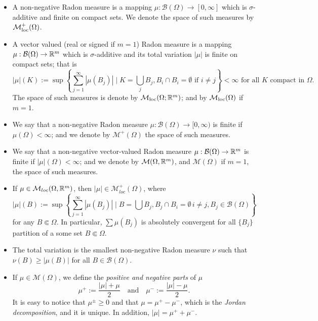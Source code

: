 \begin{definition} \hfill
\begin{itemize}
\item A non-negative Radon measure is a mapping $\mu : \mathcal{B}(\Omega) \to
[0,\infty]$ which is $\sigma$-additive and finite on compact sets. We denote the space of such measures by $\mathcal{M}_{\rm loc}^{+}(\Omega)$.
\item A vector valued (real or signed if $m = 1$) Radon measure is a mapping $\mu :
\mathcal{B}(\Omega) \to \mathbb{R}^m$ which is $\sigma$-additive and its total variation
$|\mu|$ is finite on compact sets; that is
\[
|\mu|(K) := \sup \left\{
\sum_{j=1}^\infty |\mu(B_j)| \mid K = \bigcup_{j} B_j, B_i \cap B_i = \emptyset
\text{ if } i\neq j
\right\} < \infty \text{ for all $K$ compact in $\Omega$}.
\]
The space of such measures is denote by $\mathcal{M}_{\rm loc}(\Omega; \mathbb{R}^{m})$; and by $\mathcal{M}_{\rm loc}(\Omega)$ if $m = 1$.
\item We say that a non-negative Radon measure $\mu : \mathcal{B}(\Omega) \to
[0,\infty)$ is finite if $\mu(\Omega) < \infty$; and we denote by $\mathcal{M}^+(\Omega)$ the space of such measures.
\item We say that a non-negative vector-valued Radon measure $\mu : \mathcal{B}(\Omega) \to
\mathbb{R}^m$ is finite if $|\mu|(\Omega) < \infty$; and we denote by $\mathcal{M}(\Omega,\mathbb{R}^m)$, and $\mathcal{M}(\Omega)$ if $m = 1$, the space of such measures.
\end{itemize}
\end{definition}

\begin{remarks} \hfill
\begin{itemize}
\item If $\mu \in \mathcal{M}_{loc}(\Omega,\mathbb{R}^m)$, then $|\mu| \in
\mathcal{M}^+_{loc}(\Omega)$, where
\[
|\mu|(B) := \sup \left \{\sum_{j=1} ^\infty |\mu(B_j)| \mid 
B= \bigcup B_j, B_j \cap B_i = \emptyset \, i\neq j, B_j \in \mathcal{B}(\Omega)
\right \}
\]
for any $B \Subset \Omega$.
In particular, $\sum \mu(B_j)$ is absolutely convergent for all $\{B_j\}$
partition of a some set $B \Subset \Omega$.
\item The total variation is the smallest non-negative Radon measure $\nu$ such
that $\nu (B) \geq |\mu(B)|$ for all $B \in \mathcal{B}(\Omega)$.
\item If $\mu \in \mathcal{M}(\Omega)$, we define the {\em positive and negative
parts} of $\mu$ 
\[
\mu^+ := \frac{|\mu| + \mu}{2} \quad \text{and} \quad
\mu^- := \frac{|\mu| - \mu}{2}.
\]
It is easy to notice that $\mu^{\pm} \geq 0$ and that $\mu = \mu^{+} - \mu^{-}$, which is the {\em Jordan decomposition}, and it is unique. In addition, $|\mu| = \mu^{+} + \mu^{-}$.
\end{itemize}
\end{remarks}


